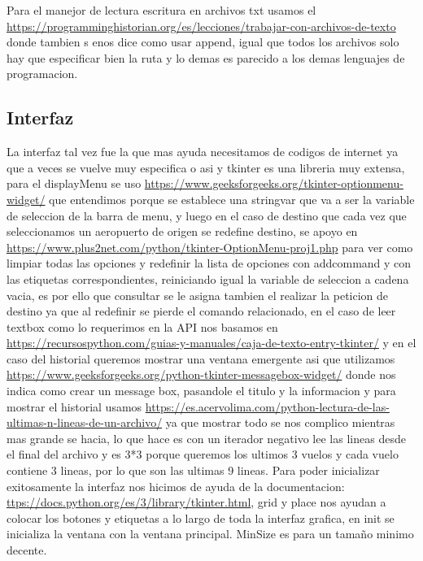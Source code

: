 \documentclass[12pt]{article}
\begin{document}
Para el manejor de lectura escritura en archivos txt usamos el \url{https://programminghistorian.org/es/lecciones/trabajar-con-archivos-de-texto} donde tambien s enos dice como usar append, igual que todos los archivos solo hay que especificar bien la ruta y lo demas es parecido a los demas lenguajes de programacion.

\subsection{Interfaz}
La interfaz tal vez fue la que mas ayuda necesitamos de codigos de internet ya que a veces se vuelve muy especifica o asi y tkinter es una libreria muy extensa, para el displayMenu se uso \url{https://www.geeksforgeeks.org/tkinter-optionmenu-widget/} que entendimos porque se establece una stringvar que va a ser la variable de seleccion de la barra de menu, y luego en el caso de destino que cada vez que seleccionamos un aeropuerto de origen se redefine destino, se apoyo en \url{https://www.plus2net.com/python/tkinter-OptionMenu-proj1.php} para ver como limpiar todas las opciones y redefinir la lista de opciones con addcommand y con las etiquetas correspondientes, reiniciando igual la variable de seleccion a cadena vacia, es por ello que consultar se le asigna tambien el realizar la peticion de destino ya que al redefinir se pierde el comando relacionado, en el caso de leer textbox como lo requerimos en la API nos basamos en \url{https://recursospython.com/guias-y-manuales/caja-de-texto-entry-tkinter/} y en el caso del historial queremos mostrar una ventana emergente asi que utilizamos \url{https://www.geeksforgeeks.org/python-tkinter-messagebox-widget/} donde nos indica como crear un message box, pasandole el titulo y la informacion y para mostrar el historial usamos \url{https://es.acervolima.com/python-lectura-de-las-ultimas-n-lineas-de-un-archivo/} ya que mostrar todo se nos complico mientras mas grande se hacia, lo que hace es con un iterador negativo lee las lineas desde el final del archivo y es 3*3 porque queremos los ultimos 3 vuelos y cada vuelo contiene 3 lineas, por lo que son las ultimas 9 lineas. Para poder inicializar exitosamente la interfaz nos hicimos de ayuda de la documentacion: \url{ttps://docs.python.org/es/3/library/tkinter.html}, grid y place nos ayudan a colocar los botones y etiquetas a lo largo de toda la interfaz grafica, en init se inicializa la ventana con la ventana principal. MinSize es para un tamaño minimo decente.
\end{document}
